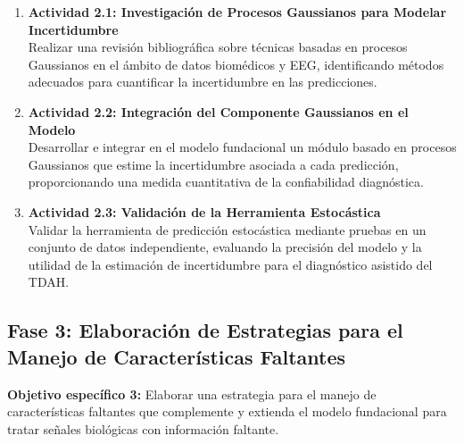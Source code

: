\begin{enumerate}
	\item \textbf{Actividad 2.1: Investigación de Procesos Gaussianos para Modelar Incertidumbre}\\
	Realizar una revisión bibliográfica sobre técnicas basadas en procesos Gaussianos en el ámbito de datos biomédicos y EEG, identificando métodos adecuados para cuantificar la incertidumbre en las predicciones.
	
	\item \textbf{Actividad 2.2: Integración del Componente Gaussianos en el Modelo}\\
	Desarrollar e integrar en el modelo fundacional un módulo basado en procesos Gaussianos que estime la incertidumbre asociada a cada predicción, proporcionando una medida cuantitativa de la confiabilidad diagnóstica.
	
	\item \textbf{Actividad 2.3: Validación de la Herramienta Estocástica}\\
	Validar la herramienta de predicción estocástica mediante pruebas en un conjunto de datos independiente, evaluando la precisión del modelo y la utilidad de la estimación de incertidumbre para el diagnóstico asistido del TDAH.
\end{enumerate}

\subsection*{Fase 3: Elaboración de Estrategias para el Manejo de Características Faltantes}
\textbf{Objetivo específico 3:} Elaborar una estrategia para el manejo de características faltantes que complemente y extienda el modelo fundacional para tratar señales biológicas con información faltante.

